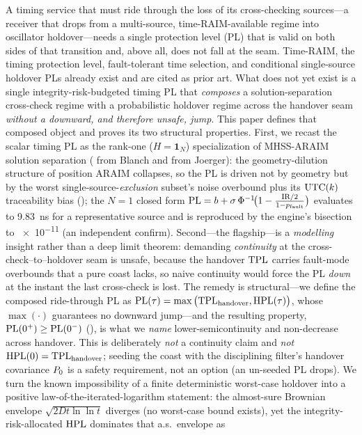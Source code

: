A timing service that must ride through the loss of its cross-checking sources---a
receiver that drops from a multi-source, time-RAIM-available regime into
oscillator holdover---needs a single protection level (PL) that is valid on both
sides of that transition and, above all, does not fall at the seam. Time-RAIM,
the timing protection level, fault-tolerant time selection, and conditional
single-source holdover PLs already exist and are cited as prior art. What does
not yet exist is a single integrity-risk-budgeted timing PL that \emph{composes}
a solution-separation cross-check regime with a probabilistic holdover regime
across the handover seam \emph{without a downward, and therefore unsafe, jump}.
This paper defines that composed object and proves its two structural properties.
First, we recast the scalar timing PL as the rank-one ($H=\bm 1_N$)
specialization of MHSS-ARAIM solution separation (\Cited{} from Blanch and from
Joerger): the geometry-dilution structure of position ARAIM collapses, so the PL
is driven not by geometry but by the worst single-source-\emph{exclusion} subset's
noise overbound plus its $\mathrm{UTC}(k){}$ traceability bias (\Proven{}); the $N=1$ closed
form $\mathrm{PL}=b+\sigma\,\Phi^{-1}\!\big(1-\tfrac{\mathrm{IR}/2}{1-p_{\mathrm{fault}}}\big)$
evaluates to \SI{9.83}{\nano\second} for a representative source and is
reproduced by the engine's bisection to \num{e-11} (an independent confirm).
Second---the flagship---is a \emph{modelling} insight rather than a deep limit
theorem: demanding \emph{continuity} at the cross-check--to--holdover seam is
unsafe, because the handover $\mathrm{TPL}$ carries fault-mode overbounds that a pure coast
lacks, so naive continuity would force the PL \emph{down} at the instant the last
cross-check is lost. The remedy is structural---we define the composed ride-through
PL as $\mathrm{PL}(\tau)=\max\big(\mathrm{TPL}_{\mathrm{handover}},\mathrm{HPL}(\tau)\big)$, whose
$\max(\cdot)$ guarantees no downward jump---and the resulting property,
$\mathrm{PL}(0^{+})\ge\mathrm{PL}(0^{-})$ (\Proven{}), is what we \emph{name}
lower-semicontinuity and non-decrease across handover. This is deliberately
\emph{not} a continuity claim and \emph{not} $\mathrm{HPL}(0)=\mathrm{TPL}_{\mathrm{handover}}$;
seeding the coast with the disciplining filter's handover covariance $P_0$ is a
safety requirement, not an option (an un-seeded PL drops). We turn the known impossibility of a finite deterministic
worst-case holdover into a positive law-of-the-iterated-logarithm statement: the
almost-sure Brownian envelope $\sqrt{2Dt\ln\ln t}$ diverges (no worst-case bound
exists), yet the integrity-risk-allocated $\mathrm{HPL}$ dominates that a.s.\ envelope as
